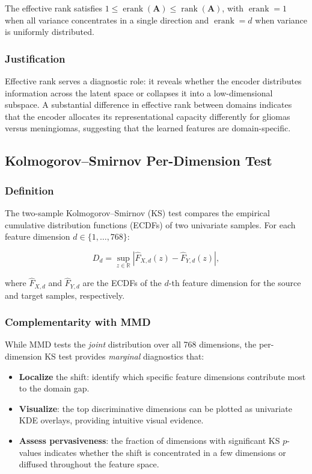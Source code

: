 \documentclass[11pt,a4paper]{article}
\DeclareMathOperator{\rank}{rank}
\DeclareMathOperator{\erank}{erank}
\newcommand{\R}{\mathbb{R}}
\theoremstyle{definition}
\begin{document}
The effective rank satisfies $1 \leq \erank(\bm{A}) \leq \rank(\bm{A})$, with $\erank = 1$ when all variance concentrates in a single direction and $\erank = d$ when variance is uniformly distributed.

\subsubsection{Justification}

Effective rank serves a diagnostic role: it reveals whether the encoder distributes information across the latent space or collapses it into a low-dimensional subspace. A substantial difference in effective rank between domains indicates that the encoder allocates its representational capacity differently for gliomas versus meningiomas, suggesting that the learned features are domain-specific.


\subsection{Kolmogorov--Smirnov Per-Dimension Test}\label{sec:ks}

\subsubsection{Definition}

The two-sample Kolmogorov--Smirnov (KS) test \cite{kolmogorov1933,smirnov1948} compares the empirical cumulative distribution functions (ECDFs) of two univariate samples. For each feature dimension $d \in \{1, \ldots, 768\}$:

\begin{equation}\label{eq:ks}
  D_d = \sup_{z \in \R} \left| \hat{F}_{X,d}(z) - \hat{F}_{Y,d}(z) \right|,
\end{equation}

where $\hat{F}_{X,d}$ and $\hat{F}_{Y,d}$ are the ECDFs of the $d$-th feature dimension for the source and target samples, respectively.

\subsubsection{Complementarity with MMD}

While MMD tests the \emph{joint} distribution over all 768 dimensions, the per-dimension KS test provides \emph{marginal} diagnostics that:
\begin{itemize}[nosep]
  \item \textbf{Localize} the shift: identify which specific feature dimensions contribute most to the domain gap.
  \item \textbf{Visualize}: the top discriminative dimensions can be plotted as univariate KDE overlays, providing intuitive visual evidence.
  \item \textbf{Assess pervasiveness}: the fraction of dimensions with significant KS $p$-values indicates whether the shift is concentrated in a few dimensions or diffused throughout the feature space.
\end{itemize}
\end{document}

